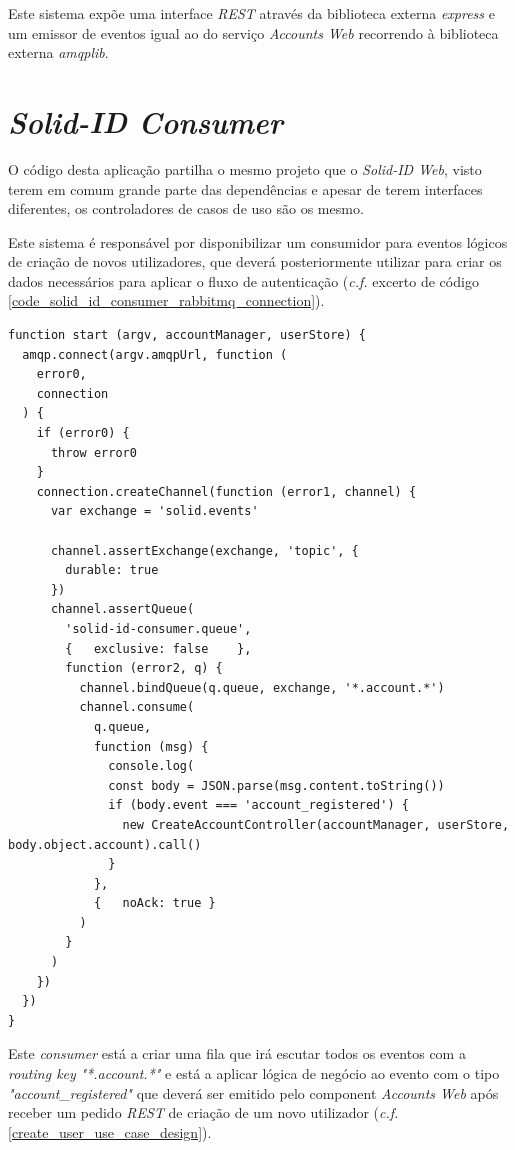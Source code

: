 Este sistema expõe uma interface \emph{\acrshort{REST}} através da biblioteca externa \emph{express} e um emissor de eventos igual ao do serviço \emph{Accounts Web} recorrendo à biblioteca externa \emph{amqplib}.

\section{\emph{Solid-ID Consumer}}
O código desta aplicação partilha o mesmo projeto que o \emph{Solid-ID Web}, visto terem em comum grande parte das dependências e apesar de terem interfaces diferentes, os controladores de casos de uso são os mesmo.

Este sistema é responsável por disponibilizar um consumidor para eventos lógicos de criação de novos utilizadores, que deverá posteriormente utilizar para criar os dados necessários para aplicar o fluxo de autenticação (\emph{c.f.} excerto de código \ref{code_solid_id_consumer_rabbitmq_connection}).

\begin{lstlisting}[caption={\emph{Consumer} responsável pela ligação ao \emph{RabbitMQ}}, label={code_solid_id_consumer_rabbitmq_connection}]
function start (argv, accountManager, userStore) {
  amqp.connect(argv.amqpUrl, function (
    error0,
    connection
  ) {
    if (error0) {
      throw error0
    }
    connection.createChannel(function (error1, channel) {
      var exchange = 'solid.events'

      channel.assertExchange(exchange, 'topic', {
        durable: true
      })
      channel.assertQueue(
        'solid-id-consumer.queue',
        {   exclusive: false    },
        function (error2, q) {
          channel.bindQueue(q.queue, exchange, '*.account.*')
          channel.consume(
            q.queue,
            function (msg) {
              console.log(
              const body = JSON.parse(msg.content.toString())
              if (body.event === 'account_registered') {
                new CreateAccountController(accountManager, userStore, body.object.account).call()
              }
            },
            {   noAck: true }
          )
        }
      )
    })
  })
}

\end{lstlisting}

Este \emph{consumer} está a criar uma fila que irá escutar todos os eventos com a \emph{routing key} \emph{"*.account.*"} e está a aplicar lógica de negócio ao evento com o tipo \emph{"account\_registered"} que deverá ser emitido pelo component \emph{Accounts Web} após receber um pedido \emph{\acrshort{REST}} de criação de um novo utilizador  (\emph{c.f.}  \ref{create_user_use_case_design}).

